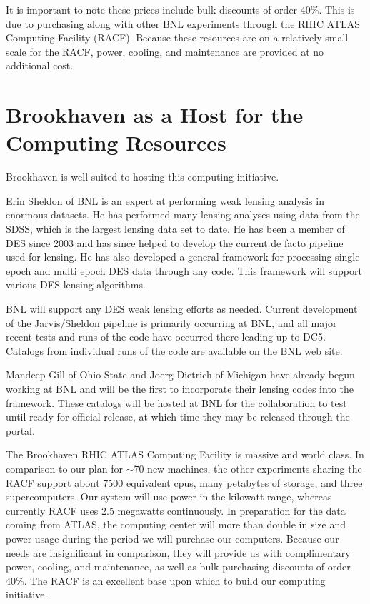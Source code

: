 \documentclass[12pt]{article}
\begin{document}
It is important to note these prices include bulk discounts of order 40\%.
This is due to purchasing along with other BNL experiments through the RHIC
ATLAS Computing Facility (RACF).  Because these resources are on a relatively
small scale for the RACF, power, cooling, and maintenance are provided at no
additional cost.  


\section{Brookhaven as a Host for the Computing Resources}

Brookhaven is well suited to hosting this computing initiative. 

Erin Sheldon of BNL is an expert at performing weak lensing analysis in
enormous datasets. He has performed many lensing analyses using data from the
SDSS, which is the largest lensing data set to date.   He has been a member of
DES since 2003 and has since helped to develop the current de facto
pipeline used for lensing. He has also developed a general framework for
processing single epoch and multi epoch DES data through any code.  This
framework will support various DES lensing algorithms.

BNL will support any DES weak lensing efforts as needed.  Current development
of the Jarvis/Sheldon pipeline is primarily occurring at BNL, and all major
recent tests and runs of the code have occurred there leading up to DC5.
Catalogs from individual runs of the code are available on the BNL web site.

Mandeep Gill of Ohio State and Joerg Dietrich of Michigan have already begun
working at BNL and will be the first to incorporate their lensing codes into
the framework.  These catalogs will be hosted at BNL for the collaboration to
test until ready for official release, at which time they may be released
through the portal.


The Brookhaven RHIC ATLAS Computing Facility is massive and world class.  In
comparison to our plan for $\sim$70 new machines, the other experiments sharing
the RACF support about 7500 equivalent cpus, many petabytes of storage, and
three supercomputers.  Our system will use power in the kilowatt range, whereas
currently RACF uses 2.5 megawatts continuously.  In preparation for the data
coming from ATLAS, the computing center will more than double in size and power
usage during the period we will purchase our computers.  Because our needs are
insignificant in comparison, they will provide us with complimentary power,
cooling, and maintenance, as well as bulk purchasing discounts of order 40\%.
The RACF is an excellent base upon which to build our computing initiative.




\end{document}
